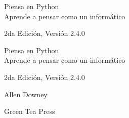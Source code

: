 \documentclass[10pt]{book}
\newcommand{\theversion}{2da Edición, Versión 2.4.0}
\newcommand{\thedate}{}
\begin{document}
\begin{latexonly}

\renewcommand{\blankpage}{\thispagestyle{empty} \quad \newpage}



\thispagestyle{empty}

\begin{flushright}
\vspace*{2.0in}

\begin{spacing}{3}
{\huge Piensa en Python}\\
{\Large Aprende a pensar como un informático}
\end{spacing}

\vspace{0.25in}

\theversion

\thedate

\vfill

\end{flushright}


\blankpage
\blankpage

\pagebreak
\thispagestyle{empty}

\begin{flushright}
\vspace*{2.0in}

\begin{spacing}{3}
{\huge Piensa en Python}\\
{\Large Aprende a pensar como un informático}
\end{spacing}

\vspace{0.25in}

\theversion

\thedate

\vspace{1in}


{\Large
Allen Downey\\
}


\vspace{0.5in}

{\Large Green Tea Press}


\end{flushright}
\end{latexonly}
\end{document}
